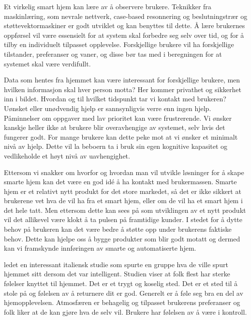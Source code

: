 {Et virkelig smart hjem kan lære av å observere brukere. Teknikker fra maskinlæring, som nevrale nettverk, case-based resonnering og beslutningstrær og støttevektormaskiner er godt utviklet og kan benyttes til dette. Å lære brukernes oppførsel vil være essensielt for at system skal forbedre seg selv over tid, og for å tilby en individuelt tilpasset opplevelse. Forskjellige brukere vil ha forskjellige tilstander, preferanser og vaner, og disse bør tas med i beregningen for at systemet skal være verdifullt.

Data som hentes fra hjemmet kan være interessant for forskjellige brukere, men hvilken informasjon skal hver person motta? Her kommer privathet og sikkerhet inn i bildet. Hvordan og til hvilket tidspunkt tar vi kontakt med brukeren? Uønsket eller unødvendig hjelp er sannsynligvis verre enn ingen hjelp. Påminnelser om oppgaver med lav prioritet kan være frustrerende. Vi ønsker kanskje heller ikke at brukere blir overavhengige av systemet, selv hvis det fungerer godt. For mange brukere kan dette peke mot at vi ønsker et minimalt nivå av hjelp. Dette vil la beboern ta i bruk sin egen kognitive kapasitet og vedlikeholde et høyt nivå av uavhengighet. 

Ettersom vi snakker om hvorfor og hvordan man vil utvikle løsninger for å skape smarte hjem kan det være en god idé å ha kontakt med brukermassen. Smarte hjem er et relativt nytt produkt for det store markedet, så det er ikke sikkert at brukerene vet hva de vil ha fra et smart hjem, eller om de vil ha et smart hjem i det hele tatt. Men ettersom dette kan sees på som utviklingen av et nytt produkt vil det allikevel være klokt å ta pulsen på framtidige kunder. I stedet for å dytte behov på brukeren kan det være bedre å støtte opp under brukerens faktiske behov. Dette kan hjelpe oss å bygge produkter som blir godt motatt og dermed kan vi framskynde innføringen av smarte og automatiserte hjem.

\citet{bonino11} ledet en interessant italiensk studie som spurte en gruppe hva de ville spurt hjemmet sitt dersom det var intelligent. Studien viser at folk flest har sterke følelser knyttet til hjemmet. Det er et trygt og koselig sted. Det er et sted til å stole på og følelsen av å returnere dit er god. Generelt er å føle seg bra en del av hjemopplevelsen. Atmosfæren er behagelig og tilpasset brukerens preferanser og folk liker at de kan gjøre hva de selv vil. Brukere har følelsen av å være i kontroll.

}
